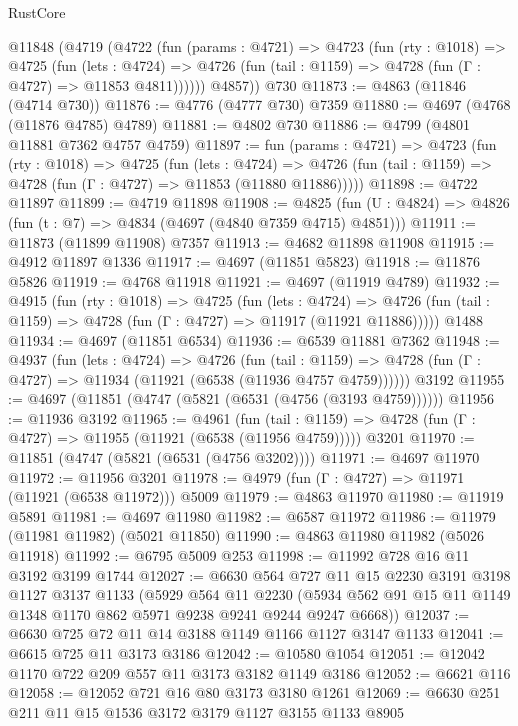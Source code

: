 \begin{lexlean}{RustCore}
\begin{coremodule}
    @11848
      (@4719
        (@4722
          (fun (params : @4721) =>
          @4723
            (fun (rty : @1018) =>
            @4725
              (fun (lets : @4724) =>
              @4726 (fun (tail : @1159) => @4728 (fun (Γ : @4727) => @11853 @4811))))))
        @4857))
    @730
@11873 := @4863 (@11846 (@4714 @730))
@11876 := @4776 (@4777 @730) @7359
@11880 := @4697 (@4768 (@11876 @4785) @4789)
@11881 := @4802 @730
@11886 := @4799 (@4801 @11881 @7362 @4757 @4759)
@11897 := fun (params : @4721) =>
  @4723
    (fun (rty : @1018) =>
    @4725
      (fun (lets : @4724) =>
      @4726 (fun (tail : @1159) => @4728 (fun (Γ : @4727) => @11853 (@11880 @11886)))))
@11898 := @4722 @11897
@11899 := @4719 @11898
@11908 := @4825 (fun (U : @4824) => @4826 (fun (t : @7) => @4834 (@4697 (@4840 @7359 @4715) @4851)))
@11911 := @11873 (@11899 @11908) @7357
@11913 := @4682 @11898 @11908
@11915 := @4912 @11897 @1336
@11917 := @4697 (@11851 @5823)
@11918 := @11876 @5826
@11919 := @4768 @11918
@11921 := @4697 (@11919 @4789)
@11932 := @4915
    (fun (rty : @1018) =>
    @4725
      (fun (lets : @4724) =>
      @4726 (fun (tail : @1159) => @4728 (fun (Γ : @4727) => @11917 (@11921 @11886)))))
    @1488
@11934 := @4697 (@11851 @6534)
@11936 := @6539 @11881 @7362
@11948 := @4937
    (fun (lets : @4724) =>
    @4726
      (fun (tail : @1159) =>
      @4728 (fun (Γ : @4727) => @11934 (@11921 (@6538 (@11936 @4757 @4759))))))
    @3192
@11955 := @4697 (@11851 (@4747 (@5821 (@6531 (@4756 (@3193 @4759))))))
@11956 := @11936 @3192
@11965 := @4961
    (fun (tail : @1159) => @4728 (fun (Γ : @4727) => @11955 (@11921 (@6538 (@11956 @4759)))))
    @3201
@11970 := @11851 (@4747 (@5821 (@6531 (@4756 @3202))))
@11971 := @4697 @11970
@11972 := @11956 @3201
@11978 := @4979 (fun (Γ : @4727) => @11971 (@11921 (@6538 @11972))) @5009
@11979 := @4863 @11970
@11980 := @11919 @5891
@11981 := @4697 @11980
@11982 := @6587 @11972
@11986 := @11979 (@11981 @11982) (@5021 @11850)
@11990 := @4863 @11980 @11982 (@5026 @11918)
@11992 := @6795 @5009 @253
@11998 := @11992 @728 @16 @11 @3192 @3199 @1744
@12027 := @6630
    @564
    @727
    @11
    @15
    @2230
    @3191
    @3198
    @1127
    @3137
    @1133
    (@5929
      @564
      @11
      @2230
      (@5934 @562 @91 @15 @11 @1149 @1348 @1170 @862 @5971 @9238 @9241 @9244 @9247 @6668))
@12037 := @6630 @725 @72 @11 @14 @3188 @1149 @1166 @1127 @3147 @1133
@12041 := @6615 @725 @11 @3173 @3186
@12042 := @10580 @1054
@12051 := @12042 @1170 @722 @209 @557 @11 @3173 @3182 @1149 @3186
@12052 := @6621 @116
@12058 := @12052 @721 @16 @80 @3173 @3180 @1261
@12069 := @6630 @251 @211 @11 @15 @1536 @3172 @3179 @1127 @3155 @1133 @8905

\end{coremodule}
\end{lexlean}
